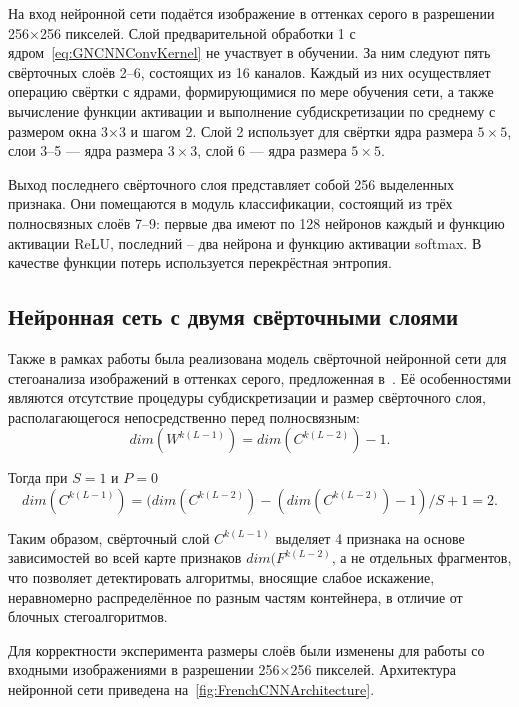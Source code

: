 На вход нейронной сети подаётся изображение в оттенках серого в разрешении 256×256 пикселей. Слой предварительной обработки 1 с ядром~\eqref{eq:GNCNNConvKernel} не участвует в обучении. За ним следуют пять свёрточных слоёв 2--6, состоящих из 16 каналов. Каждый из них осуществляет операцию свёртки с ядрами, формирующимися по мере обучения сети, а также вычисление функции активации и выполнение субдискретизации по среднему с размером окна 3×3 и шагом 2. Слой 2 использует для свёртки ядра размера $ 5 \times 5 $, слои 3--5 --- ядра размера $ 3 \times 3 $, слой 6 --- ядра размера $ 5 \times 5 $.

Выход последнего свёрточного слоя представляет собой 256 выделенных признака. Они помещаются в модуль классификации, состоящий из трёх полносвязных слоёв 7--9: первые два имеют по 128 нейронов каждый и функцию активации ReLU, последний – два нейрона и функцию активации softmax. В качестве функции потерь используется перекрёстная энтропия.

\subsection{Нейронная сеть с двумя свёрточными слоями}

Также в рамках работы была реализована модель свёрточной нейронной сети для стегоанализа изображений в оттенках серого, предложенная в~\cite{FrenchCNN}. Её особенностями являются отсутствие процедуры субдискретизации и размер свёрточного слоя, располагающегося непосредственно перед полносвязным:
\begin{equation*}
dim(W^{k(L - 1)}) = dim(C^{k(L - 2)}) - 1.
\end{equation*}

Тогда при $ S = 1$ и $ P = 0 $
\begin{equation*}
dim(C^{k(L - 1)}) = (dim(C^{k(L - 2)}) - (dim(C^{k(L - 2)}) - 1) / S + 1 = 2.
\end{equation*}

Таким образом, свёрточный слой $ C^{k(L - 1)} $ выделяет 4 признака на основе зависимостей во всей карте признаков $ dim(F^{k(L - 2)} $, а не отдельных фрагментов, что позволяет детектировать алгоритмы, вносящие слабое искажение, неравномерно распределённое по разным частям контейнера, в отличие от блочных стегоалгоритмов.

Для корректности эксперимента размеры слоёв были изменены для работы со входными изображениями в разрешении 256×256 пикселей. Архитектура нейронной сети приведена на~\ref{fig:FrenchCNNArchitecture}.

